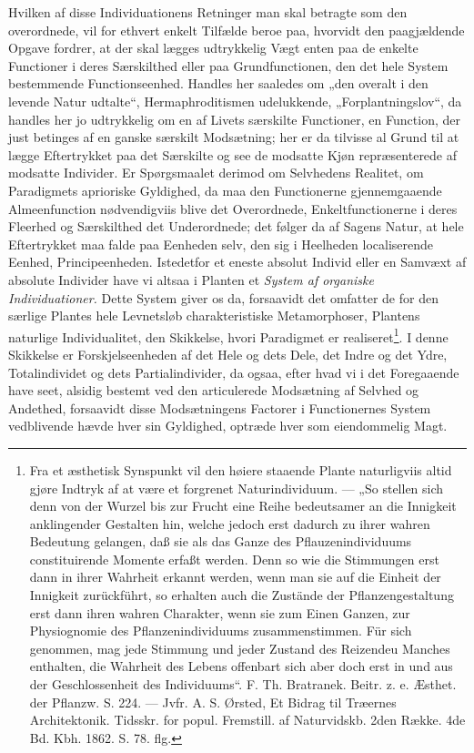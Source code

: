 \documentclass[12pt,a4paper]{book}
\begin{document}
Hvilken af disse Individuationens Retninger man skal betragte som den
overordnede, vil for ethvert enkelt Tilfælde beroe paa, hvorvidt den
paagjældende Opgave fordrer, at der skal lægges udtrykkelig Vægt enten paa de
enkelte Functioner i deres Særskilthed eller paa Grundfunctionen, den det hele
System bestemmende Functionseenhed. Handles her saaledes om „den overalt i den
levende Natur udtalte“, Hermaphroditismen udelukkende, „Forplantningslov“, da
handles her jo udtrykkelig om en af Livets særskilte Functioner, en Function,
der just betinges af en ganske særskilt Modsætning; her er da tilvisse al Grund
til at lægge Eftertrykket paa det Særskilte og see de modsatte Kjøn
repræsenterede af modsatte Individer. Er Spørgsmaalet derimod om Selvhedens
Realitet, om Paradigmets aprioriske Gyldighed, da maa den Functionerne
gjennemgaaende Almeenfunction nødvendigviis blive det Overordnede,
Enkeltfunctionerne i deres Fleerhed og Særskilthed det Underordnede; det følger
da af Sagens Natur, at hele Eftertrykket maa falde paa Eenheden selv, den sig i
Heelheden localiserende Eenhed, Principeenheden.
\setcounter{footnote}{0}
Istedetfor et eneste absolut Individ eller en Samvæxt af absolute Individer have
vi altsaa i Planten et \emph{System af organiske Individuationer.} Dette System
giver os da, forsaavidt det omfatter de for den særlige Plantes hele Levnetsløb
charakteristiske Metamorphoser, Plantens naturlige Individualitet, den
Skikkelse, hvori Paradigmet er realiseret\footnote{Fra et æsthetisk Synspunkt
vil den høiere staaende Plante naturligviis altid gjøre Indtryk af at være et
forgrenet Naturindividuum. --- „So stellen sich denn von der Wurzel bis zur
Frucht eine Reihe bedeutsamer an die Innigkeit anklingender Gestalten hin,
welche jedoch erst dadurch zu ihrer wahren Bedeutung gelangen, daß sie als das
Ganze des Pflauzenindividuums constituirende Momente erfaßt werden.
Denn so wie die Stimmungen erst dann in ihrer Wahrheit erkannt werden, wenn man
sie auf die Einheit der Innigkeit zurückführt, so erhalten auch die Zustände der
Pflanzengestaltung erst dann ihren wahren Charakter, wenn sie zum Einen Ganzen,
zur Physiognomie des Pflanzenindividuums zusammenstimmen. Für sich genommen,
mag jede Stimmung und jeder Zustand des Reizendeu Manches enthalten, die
Wahrheit des Lebens offenbart sich aber doch erst in und aus der Geschlossenheit
des Individuums“.
F. Th. Bratranek. Beitr. z. e. Æsthet. der Pflanzw. S. 224. --- Jvfr.
A. S. Ørsted, Et Bidrag til Træernes Architektonik. Tidsskr. for popul.
Fremstill. af Naturvidskb. 2den Række. 4de Bd. Kbh. 1862. S. 78. flg.}. I denne
Skikkelse er Forskjelseenheden af det Hele og dets Dele, det Indre og det Ydre,
Totalindividet og dets Partialindivider, da ogsaa, efter hvad vi i det
Foregaaende have seet, alsidig bestemt ved den articulerede Modsætning af
Selvhed og Andethed, forsaavidt disse Modsætningens Factorer i Functionernes
System vedblivende hævde hver sin Gyldighed, optræde hver som eiendommelig Magt.
\end{document}
